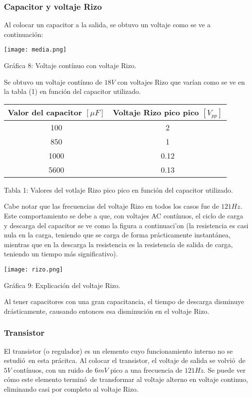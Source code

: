 \documentclass[11pt]{article}
\renewcommand{\=}[1]{\stackrel{#1}{=}} %
\theoremstyle{definition}
\theoremstyle{remark}
\begin{document}
\subsubsection*{Capacitor y voltaje Rizo}
Al colocar un capacitor a la salida, se obtuvo un voltaje como se ve a continuaci\'on:
\begin{center}
\texttt{[image: media.png]}
\end{center} 
\begin{center}
Gr\'afica 8: Voltaje cont\'inuo con voltaje Rizo.
\end{center}
Se obtuvo un voltaje cont\'inuo de $18V$ con voltajes Rizo que var\'ian como se ve en la tabla (1) en funci\'on del capacitor utilizado.
\begin{center}
\begin{tabular}{||c|c||}
\hline
Valor del capacitor $[\mu F]$ & Voltaje Rizo pico pico $[V_{pp}]$ \\ \hline
100 & 2 \\ \hline
850 & 1 \\ \hline
1000 & 0.12 \\ \hline
5600 & 0.13 \\ \hline
\end{tabular}
\end{center}
\begin{center}
Tabla 1: Valores del votlaje Rizo pico pico en funci\'on del capacitor utilizado.
\end{center}
Cabe notar que las frecuencias del voltaje Rizo en todos los casos fue de $121Hz$. Este comportamiento se debe a que, con voltajes AC cont\'inuos, el ciclo de carga y descarga del capacitor se ve como la figura a continuaci'on (la resistencia es casi nula en la carga, teniendo que se carga de forma pr\'acticamente instant\'anea, mientras que en la descarga la resistencia es la resistencia de salida de carga, teniendo un tiempo m\'as significativo).
\begin{center}
\texttt{[image: rizo.png]}
\end{center} 
\begin{center}
Gr\'afica 9: Explicaci\'on del voltaje Rizo.
\end{center}
Al tener capacitores con una gran capacitancia, el tiempo de descarga disminuye dr\'asticamente, causando entonces esa disminuci\'on en el voltaje Rizo.

\subsubsection*{Transistor}
El transistor (o regulador) es un elemento cuyo funcionamiento interno no se estudi\'o\ en esta pr\'acitca. Al colocar el transistor, el voltaje de salida se volvi\'o\ de $5V$ cont\'inuos, con un ruido de $6mV$ pico a una frecuencia de $121Hz$. Se puede ver c\'omo este elemento termin\'o\ de transformar al voltaje alterno en voltaje continuo, eliminando casi por completo al voltaje Rizo.
\end{document}
